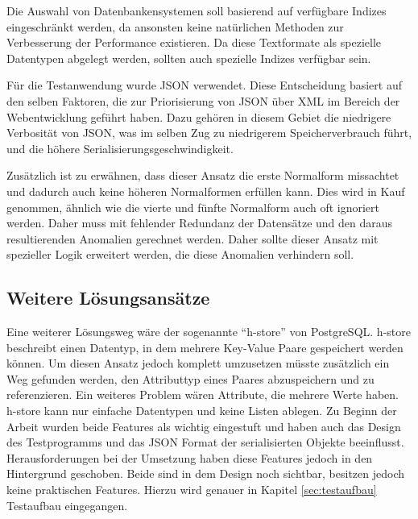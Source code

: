 Die Auswahl von Datenbankensystemen soll basierend auf verfügbare Indizes eingeschränkt werden, da ansonsten keine natürlichen Methoden zur Verbesserung der Performance existieren. Da diese Textformate als spezielle Datentypen abgelegt werden, sollten auch spezielle Indizes verfügbar sein.

Für die Testanwendung wurde JSON verwendet. Diese Entscheidung basiert auf den selben Faktoren, die zur Pri­o­ri­sie­rung von JSON über XML im Bereich der Webentwicklung geführt haben. Dazu gehören in diesem Gebiet die niedrigere Verbosität von JSON, was im selben Zug zu niedrigerem Speicherverbrauch führt, und die höhere Serialisierungsgeschwindigkeit\cite{NurzhanNurseitov.2009}.

Zusätzlich ist zu erwähnen, dass dieser Ansatz die erste Normalform missachtet und dadurch auch keine höheren Normalformen erfüllen kann. Dies wird in Kauf genommen, ähnlich wie die vierte und fünfte Normalform auch oft ignoriert werden. Daher muss mit fehlender Redundanz der Datensätze und den daraus resultierenden Anomalien gerechnet werden. Daher sollte dieser Ansatz mit spezieller Logik erweitert werden, die diese Anomalien verhindern soll.

\subsection{Weitere Lösungsansätze}

Eine weiterer Lösungsweg wäre der sogenannte ``h-store'' von PostgreSQL. h-store beschreibt einen Datentyp, in dem mehrere Key-Value Paare gespeichert werden können. Um diesen Ansatz jedoch komplett umzusetzen müsste zusätzlich ein Weg gefunden werden, den Attributtyp eines Paares abzuspeichern und zu referenzieren. Ein weiteres Problem wären Attribute, die mehrere Werte haben. h-store kann nur einfache Datentypen und keine Listen ablegen. Zu Beginn der Arbeit wurden beide Features als wichtig eingestuft und haben auch das Design des Testprogramms und das JSON Format der serialisierten Objekte beeinflusst. Herausforderungen bei der Umsetzung haben diese Features jedoch in den Hintergrund geschoben. Beide sind in dem Design noch sichtbar, besitzen jedoch keine praktischen Features. Hierzu wird genauer in Kapitel \ref{sec:testaufbau} Testaufbau eingegangen.



%
%

